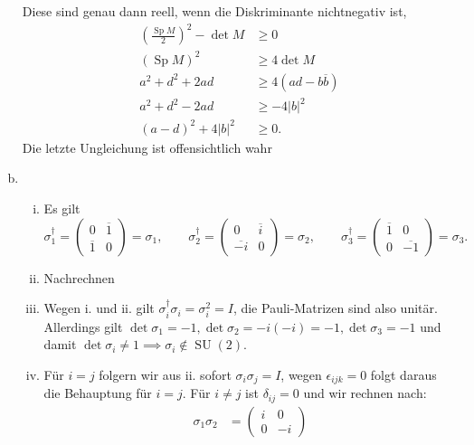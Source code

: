 \documentclass{article}
\begin{document}
\begin{enumerate}[(a)]
\[        \]
        Diese sind genau dann reell, wenn die Diskriminante nichtnegativ ist,
        \begin{align*}
            \left(\frac{\operatorname{Sp} M}{2}\right)^2 - \det M &\geq 0\\
            (\operatorname{Sp} M)^2 &\geq 4 \det M\\
            a^2 + d^2 + 2ad &\geq 4 (ad - b\overline{b})\\
            a^2 + d^2 - 2ad &\geq -4 |b|^2\\
            (a- d)^2 + 4 |b|^2 &\geq 0.
        \end{align*}
        Die letzte Ungleichung ist offensichtlich wahr
        \item \begin{enumerate}[i.]
            \item Es gilt
            \[
                \sigma_1^\dagger = \begin{pmatrix}
                    0 & \overline{1} \\ \overline{1} & 0 
                \end{pmatrix} = \sigma_1,\qquad \sigma_2^\dagger = \begin{pmatrix}
                    0 & \overline{i}\\ \overline{-i} & 0 
                \end{pmatrix} = \sigma_2,\qquad \sigma_3^\dagger = \begin{pmatrix}
                    \overline{1} & 0\\0&\overline{-1}
                \end{pmatrix} = \sigma_3.
            \]
            \item Nachrechnen
            \item Wegen i. und ii. gilt $\sigma_i^\dagger \sigma_i = \sigma_i^2 = I$, die Pauli-Matrizen sind also unitär. Allerdings gilt $\det \sigma_1 = -1, \det \sigma_2 = -i(-i) = -1, \det \sigma_3 = -1$ und damit $\det \sigma_i \neq 1 \implies \sigma_i \notin \operatorname{SU}(2)$.
            \item Für $i = j$ folgern wir aus ii. sofort $\sigma_i\sigma_j = I$, wegen $\epsilon_{ijk} = 0$ folgt daraus die Behauptung für $i = j$. Für $i \neq j$ ist $\delta_{ij} = 0$ und wir rechnen nach:
            \begin{align*}
                \sigma_1 \sigma_2 &= \begin{pmatrix}
                    i & 0\\
                    0 & -i

\end{pmatrix}
\end{align*}
\end{enumerate}
\end{enumerate}
\end{document}
